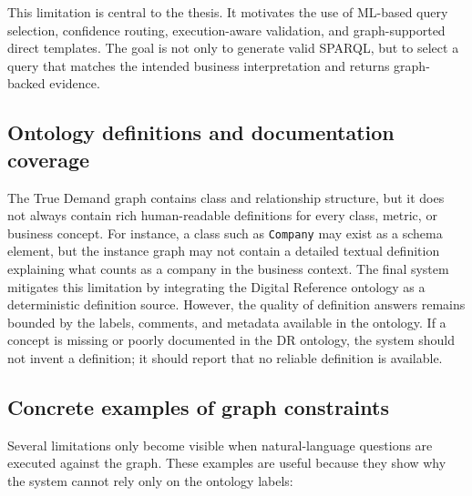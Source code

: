 \documentclass[
  12pt,
  english,
  oneside]{report}
\begin{document}
This limitation is central to the thesis. It motivates the use of ML-based query selection, confidence routing, execution-aware validation, and graph-supported direct templates. The goal is not only to generate valid SPARQL, but to select a query that matches the intended business interpretation and returns graph-backed evidence.

\subsection{Ontology definitions and documentation coverage}

The True Demand graph contains class and relationship structure, but it does not always contain rich human-readable definitions for every class, metric, or business concept. For instance, a class such as \texttt{Company} may exist as a schema element, but the instance graph may not contain a detailed textual definition explaining what counts as a company in the business context. The final system mitigates this limitation by integrating the Digital Reference ontology as a deterministic definition source. However, the quality of definition answers remains bounded by the labels, comments, and metadata available in the ontology. If a concept is missing or poorly documented in the DR ontology, the system should not invent a definition; it should report that no reliable definition is available.

\subsection{Concrete examples of graph constraints}
\label{subsec:concrete-graph-constraints}

Several limitations only become visible when natural-language questions are executed against the graph. These examples are useful because they show why the system cannot rely only on the ontology labels:
\end{document}
